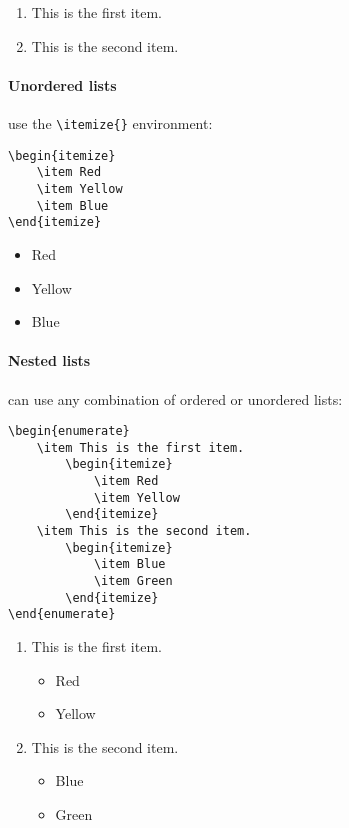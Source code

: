 \documentclass[11pt]{article}
\begin{document}
\begin{enumerate}
    \item This is the first item.
    \item This is the second item.
\end{enumerate}

\paragraph{Unordered lists} use the \verb|\itemize{}| environment:
\begin{lstlisting}
\begin{itemize}
    \item Red
    \item Yellow
    \item Blue
\end{itemize}
\end{lstlisting}

\begin{itemize}
    \item Red
    \item Yellow
    \item Blue
\end{itemize}

\paragraph{Nested lists} can use any combination of ordered or unordered lists:
\begin{lstlisting}
\begin{enumerate}
    \item This is the first item.
        \begin{itemize}
            \item Red
            \item Yellow
        \end{itemize}
    \item This is the second item.
        \begin{itemize}
            \item Blue
            \item Green
        \end{itemize}
\end{enumerate}
\end{lstlisting}

\begin{enumerate}
    \item This is the first item.
        \begin{itemize}
            \item Red
            \item Yellow
        \end{itemize}
    \item This is the second item.
        \begin{itemize}
            \item Blue
            \item Green
        \end{itemize}
\end{enumerate}
\end{document}
